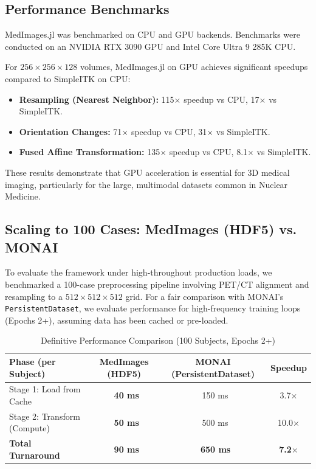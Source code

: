 \documentclass[10pt,letterpaper]{article}
\begin{document}
\subsection*{Performance Benchmarks}
MedImages.jl was benchmarked on CPU and GPU backends. Benchmarks were conducted on an NVIDIA RTX 3090 GPU and Intel Core Ultra 9 285K CPU.

For $256 \times 256 \times 128$ volumes, MedImages.jl on GPU achieves significant speedups compared to SimpleITK on CPU:
\begin{itemize}
    \item \textbf{Resampling (Nearest Neighbor):} 115$\times$ speedup vs CPU, 17$\times$ vs SimpleITK.
    \item \textbf{Orientation Changes:} 71$\times$ speedup vs CPU, 31$\times$ vs SimpleITK.
    \item \textbf{Fused Affine Transformation:} 135$\times$ speedup vs CPU, 8.1$\times$ vs SimpleITK.
\end{itemize}

These results demonstrate that GPU acceleration is essential for 3D medical imaging, particularly for the large, multimodal datasets common in Nuclear Medicine.

\subsection*{Scaling to 100 Cases: MedImages (HDF5) vs. MONAI}
To evaluate the framework under high-throughout production loads, we benchmarked a 100-case preprocessing pipeline involving PET/CT alignment and resampling to a $512 \times 512 \times 512$ grid. For a fair comparison with MONAI's \texttt{PersistentDataset}, we evaluate performance for high-frequency training loops (Epochs 2+), assuming data has been cached or pre-loaded.

\begin{table}[H]
\centering
\caption{Definitive Performance Comparison (100 Subjects, Epochs 2+)}
\begin{tabular}{|l|c|c|c|}
\hline
\textbf{Phase (per Subject)} & \textbf{MedImages (HDF5)} & \textbf{MONAI (PersistentDataset)} & \textbf{Speedup} \\
\hline
Stage 1: Load from Cache & \textbf{~40 ms} & ~150 ms & 3.7$\times$ \\
Stage 2: Transform (Compute) & \textbf{~50 ms} & ~500 ms & 10.0$\times$ \\
\hline
\textbf{Total Turnaround} & \textbf{~90 ms} & \textbf{~650 ms} & \textbf{7.2$\times$} \\
\hline
\end{tabular}
\label{tab:scaling_comparison}
\end{table}
\end{document}
